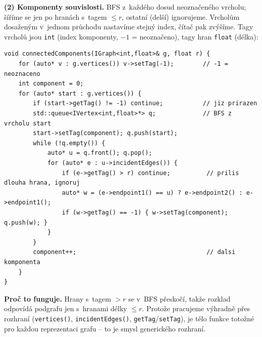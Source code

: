 \documentclass[11pt,a4paper]{article}
\newcommand{\cd}{\lstinline[style=cpp]}
\begin{document}
\begin{priklad}
\textbf{(2) Komponenty souvislosti.} BFS z~každého dosud neoznačeného vrcholu;
šíříme se jen po hranách s~tagem $\le r$, ostatní (delší) ignorujeme. Vrcholům
dosaženým v~jednom průchodu nastavíme stejný index, čítač pak zvýšíme. Tagy vrcholů
jsou \cd{int} (index komponenty, $-1$ = neoznačeno), tagy hran \cd{float} (délka):

\begin{lstlisting}[style=cpp]
void connectedComponents(IGraph<int,float>& g, float r) {
    for (auto* v : g.vertices()) v->setTag(-1);        // -1 = neoznaceno
    int component = 0;
    for (auto* start : g.vertices()) {
        if (start->getTag() != -1) continue;           // jiz prirazen
        std::queue<IVertex<int,float>*> q;             // BFS z vrcholu start
        start->setTag(component); q.push(start);
        while (!q.empty()) {
            auto* u = q.front(); q.pop();
            for (auto* e : u->incidentEdges()) {
                if (e->getTag() > r) continue;          // prilis dlouha hrana, ignoruj
                auto* w = (e->endpoint1() == u) ? e->endpoint2() : e->endpoint1();
                if (w->getTag() == -1) { w->setTag(component); q.push(w); }
            }
        }
        component++;                                    // dalsi komponenta
    }
}
\end{lstlisting}

\textbf{Proč to funguje.} Hrany s~tagem $> r$ se v~BFS přeskočí, takže rozklad
odpovídá podgrafu jen s~hranami délky $\le r$. Protože pracujeme výhradně přes
rozhraní (\cd{vertices()}, \cd{incidentEdges()}, \cd{getTag}/\cd{setTag}), je tělo
funkce totožné pro každou reprezentaci grafu -- to je smysl generického rozhraní.
\end{priklad}
\end{document}
